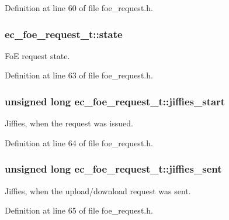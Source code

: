\-Definition at line 60 of file foe\-\_\-request.\-h.

\subsubsection[{state}]{ {\bf ec\-\_\-foe\-\_\-request\-\_\-t\-::state}}\label{structec__foe__request__t_afd59d6b4eb03fe6f05a20179cef9ac5e}


\-Fo\-E request state. 



\-Definition at line 63 of file foe\-\_\-request.\-h.

\subsubsection[{jiffies\-\_\-start}]{\setlength{\rightskip}{0pt plus 5cm}unsigned long {\bf ec\-\_\-foe\-\_\-request\-\_\-t\-::jiffies\-\_\-start}}\label{structec__foe__request__t_a3fef682f7dcd197e1fa74cf90a2e8963}


\-Jiffies, when the request was issued. 



\-Definition at line 64 of file foe\-\_\-request.\-h.

\subsubsection[{jiffies\-\_\-sent}]{\setlength{\rightskip}{0pt plus 5cm}unsigned long {\bf ec\-\_\-foe\-\_\-request\-\_\-t\-::jiffies\-\_\-sent}}\label{structec__foe__request__t_ac0d7533c6fc99ddf0a4584837a2829d3}


\-Jiffies, when the upload/download request was sent. 



\-Definition at line 65 of file foe\-\_\-request.\-h.

